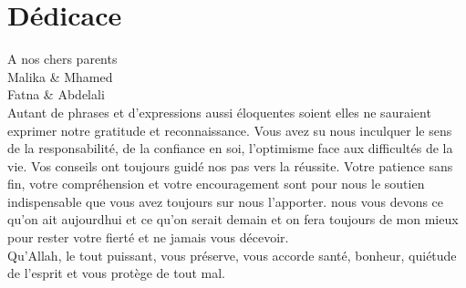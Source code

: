 \documentclass[a4paper, oneside, 12pt, final]{extreport}
\newcommand{\reportAuthor} {%
  Benhraaddi \textsc{Othmane } \\
  Elmakhantar \textsc{Ibrahim }%
}
\begin{document}

\chapter*{D\'edicace}
\thispagestyle{empty}
%

\begin{center}
{\it 
	
\vspace{1cm}\vspace{1cm}\vspace{1cm}\vspace{1cm}
A nos chers parents \\ 
Malika \& Mhamed  \\
Fatna \& Abdelali \\
 \vspace{1cm}
Autant de phrases et d’expressions aussi éloquentes soient
elles ne sauraient exprimer notre gratitude et 
reconnaissance. Vous avez su nous inculquer le sens de la 
responsabilité, de la confiance en soi, l’optimisme face aux 
difficultés de la vie. Vos conseils ont toujours guidé nos pas 
vers la réussite. Votre patience sans fin, votre compréhension 
et votre encouragement sont pour nous le soutien 
indispensable que vous avez toujours sur nous l’apporter. nous 
vous devons ce qu'on ait aujourdhui et ce qu'on serait demain et 
on fera toujours de mon mieux pour rester votre fierté et ne 
jamais vous décevoir. \\ 
\vspace{1cm}
Qu’Allah, le tout puissant, vous 
préserve, vous accorde santé, bonheur, quiétude de l’esprit et 
vous protège de tout mal. 
}
\end{center}
%
%

\end{document}

